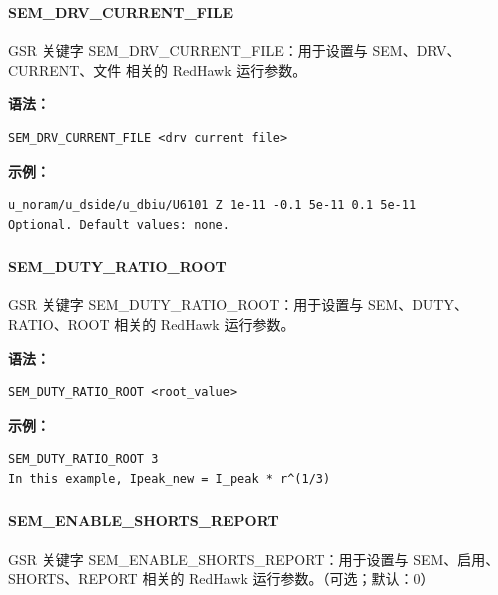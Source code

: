 \subsubsection{}
\paragraph*{SEM_DRV_CURRENT_FILE}

GSR 关键字 SEM_DRV_CURRENT_FILE：用于设置与 SEM、DRV、CURRENT、文件 相关的 RedHawk 运行参数。

\textbf{语法：}
\begin{lstlisting}
SEM_DRV_CURRENT_FILE <drv current file>
\end{lstlisting}

\textbf{示例：}
\begin{lstlisting}
u_noram/u_dside/u_dbiu/U6101 Z 1e-11 -0.1 5e-11 0.1 5e-11
Optional. Default values: none.
\end{lstlisting}

\subsubsection{}
\paragraph*{SEM_DUTY_RATIO_ROOT}

GSR 关键字 SEM_DUTY_RATIO_ROOT：用于设置与 SEM、DUTY、RATIO、ROOT 相关的 RedHawk 运行参数。

\textbf{语法：}
\begin{lstlisting}
SEM_DUTY_RATIO_ROOT <root_value>
\end{lstlisting}

\textbf{示例：}
\begin{lstlisting}
SEM_DUTY_RATIO_ROOT 3
In this example, Ipeak_new = I_peak * r^(1/3)
\end{lstlisting}

\subsubsection{}
\paragraph*{SEM_ENABLE_SHORTS_REPORT}

GSR 关键字 SEM_ENABLE_SHORTS_REPORT：用于设置与 SEM、启用、SHORTS、REPORT 相关的 RedHawk 运行参数。（可选；默认：0）

